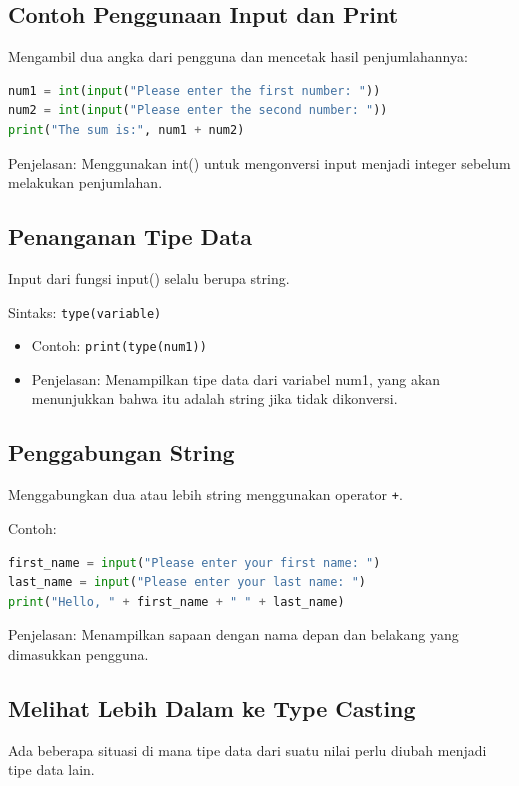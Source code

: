 \documentclass{article}
\begin{document}
\subsection{Contoh Penggunaan Input dan Print}
Mengambil dua angka dari pengguna dan mencetak hasil penjumlahannya:
\begin{lstlisting}[language=Python, caption={}, captionpos=b]
num1 = int(input("Please enter the first number: "))
num2 = int(input("Please enter the second number: "))
print("The sum is:", num1 + num2)
\end{lstlisting}

Penjelasan: Menggunakan int() untuk mengonversi input menjadi integer sebelum melakukan penjumlahan.

\subsection{Penanganan Tipe Data}
Input dari fungsi input() selalu berupa string.

Sintaks: \verb|type(variable)|
\begin{itemize}
    \item Contoh: \verb|print(type(num1))|
    \item Penjelasan: Menampilkan tipe data dari variabel num1, yang akan menunjukkan bahwa itu adalah string jika tidak dikonversi.
\end{itemize}

\subsection{Penggabungan String}
Menggabungkan dua atau lebih string menggunakan operator \verb|+|.

Contoh:
\begin{lstlisting}[language=Python, caption={}, captionpos=b]
first_name = input("Please enter your first name: ")
last_name = input("Please enter your last name: ")
print("Hello, " + first_name + " " + last_name)
\end{lstlisting}

Penjelasan: Menampilkan sapaan dengan nama depan dan belakang yang dimasukkan pengguna.

\subsection{Melihat Lebih Dalam ke Type Casting}
Ada beberapa situasi di mana tipe data dari suatu nilai perlu diubah menjadi tipe data lain.
\end{document}
